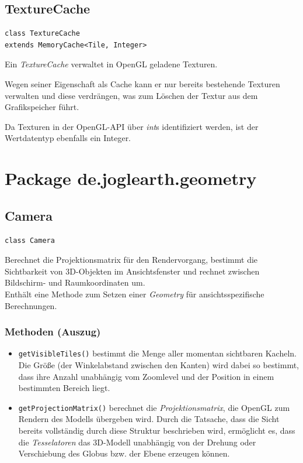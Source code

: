 \documentclass[10pt]{scrreprt}
\begin{document}
\vspace{5mm}
\subsection*{TextureCache}
\begin{lstlisting}
class TextureCache
extends MemoryCache<Tile, Integer>
\end{lstlisting}
Ein \textit{TextureCache} verwaltet in OpenGL geladene Texturen.

Wegen seiner Eigenschaft als Cache kann er nur bereits bestehende Texturen verwalten und diese verdrängen, was zum Löschen der Textur aus dem Grafikspeicher führt. 

Da Texturen in der OpenGL-API über \textit{int}s identifiziert werden, ist der Wertdatentyp ebenfalls ein Integer.\\


\vspace{5mm}
\section{Package de.joglearth.geometry}
\subsection*{Camera}
\begin{lstlisting}
class Camera
\end{lstlisting}
Berechnet die Projektionsmatrix für den Rendervorgang, bestimmt die Sichtbarkeit von 3D-Objekten im Ansichtsfenster und rechnet zwischen Bildschirm- und Raumkoordinaten um.\\
Enthält eine Methode zum Setzen einer \textit{Geometry} für ansichtsspezifische Berechnungen.\\
\subsubsection*{Methoden (Auszug)}
\begin{itemize}
\item \texttt{getVisibleTiles()} bestimmt die Menge aller momentan sichtbaren Kacheln. Die Größe (der Winkelabstand zwischen den Kanten) wird dabei so bestimmt, dass ihre Anzahl unabhängig vom Zoomlevel und der Position in einem bestimmten Bereich liegt.
\item \texttt{getProjectionMatrix()} berechnet die \textit{Projektionsmatrix}, die OpenGL zum Rendern des Modells übergeben wird. Durch die Tatsache, dass die Sicht bereits vollständig durch diese Struktur beschrieben wird, ermöglicht es, dass die \textit{Tesselatoren} das 3D-Modell unabhängig von der Drehung oder Verschiebung des Globus bzw. der Ebene erzeugen können.
\end{itemize}
\end{document}
